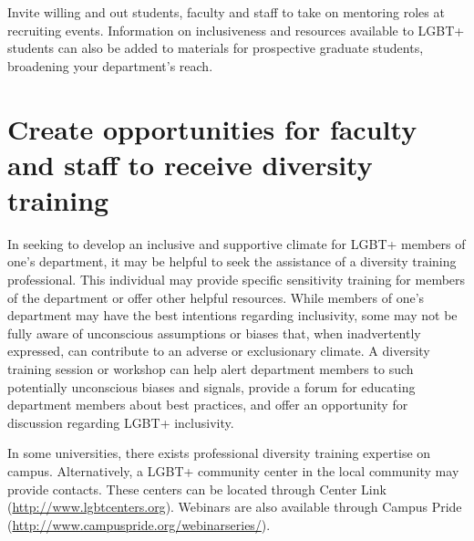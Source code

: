 Invite willing and out students, faculty and staff to take on mentoring roles at recruiting events. Information on inclusiveness and resources available to LGBT+ students can also be added to materials for prospective graduate students, broadening your department's reach. 

\section {Create opportunities for faculty and staff to receive diversity training}
\label{diversity-training}
In seeking to develop an inclusive and supportive climate for LGBT+ members of one's department, it may be helpful to seek the assistance of a diversity training professional. This individual may provide specific sensitivity training for members of the department or offer other helpful resources. While members of one's department may have the best intentions regarding inclusivity, some may not be fully aware of unconscious assumptions or biases that, when inadvertently expressed, can contribute to an adverse or exclusionary climate. A diversity training session or workshop can help alert department members to such potentially unconscious biases and signals, provide a forum for educating department members about best practices, and offer an opportunity for discussion regarding LGBT+ inclusivity.

In some universities, there exists professional diversity training expertise on campus. Alternatively, a LGBT+ community center in the local community may provide contacts. These centers can be located through Center Link (\href{http://www.lgbtcenters.org}{http://www.lgbtcenters.org}). Webinars are also available through Campus Pride (\href{http://www.campuspride.org/webinarseries/}{http://www.campuspride.org/webinarseries/}).

























